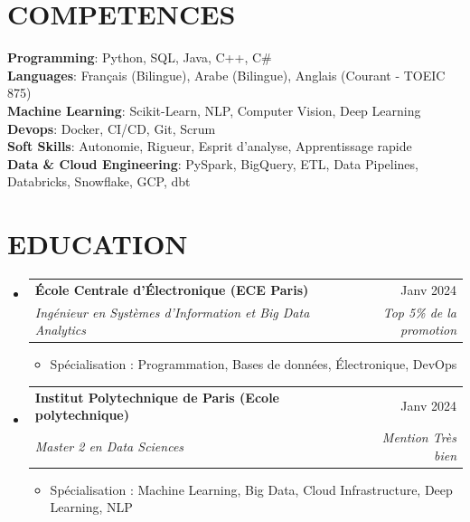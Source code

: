 \documentclass[11pt,a4paper]{article}
\makeatletter
\newcommand{\resumeItem}[1]{
  \item\footnotesize{
    {#1 \vspace{-1pt}}
  }
}
\newcommand{\resumeSubheading}[4]{
  \vspace{2pt}\item
    \begin{tabular*}{\textwidth}[t]{l@{\extracolsep{\fill}}r}
      {\small\textbf{#1}} & {\footnotesize#2} \\
      {\footnotesize\textit{#3}} & {\footnotesize\textit{#4}} \\
    \end{tabular*}\vspace{-4pt}
}
\newcommand{\resumeSubHeadingListStart}{\begin{itemize}[leftmargin=0in, label={}]}
\newcommand{\resumeSubHeadingListEnd}{\end{itemize}}
\newcommand{\resumeItemListStart}{\begin{itemize}[label={\textbullet}]}
\newcommand{\resumeItemListEnd}{\end{itemize}\vspace{0pt}}
\makeatother
\begin{document}
\section{COMPETENCES}
\begin{itemize}[leftmargin=0in, label={}]
\footnotesize{\item{
{\small\textbf{Programming}:} Python, SQL, Java, C++, C{\#} \\
\vspace{3pt}
{\small\textbf{Languages}:} Français (Bilingue), Arabe (Bilingue), Anglais (Courant - TOEIC 875) \\
\vspace{3pt}
{\small\textbf{Machine Learning}:} Scikit-Learn, NLP, Computer Vision, Deep Learning \\
\vspace{3pt}
{\small\textbf{Devops}:} Docker, CI/CD, Git, Scrum \\
\vspace{3pt}
{\small\textbf{Soft Skills}:} Autonomie, Rigueur, Esprit d'analyse, Apprentissage rapide \\
\vspace{3pt}
{\small\textbf{Data & Cloud Engineering}:} PySpark, BigQuery, ETL, Data Pipelines, Databricks, Snowflake, GCP, dbt
}
}
\end{itemize}

\section{EDUCATION}
\resumeSubHeadingListStart
    \resumeSubheading
      {École Centrale d'Électronique (ECE Paris)}
      {Janv 2024}
      {Ingénieur en Systèmes d'Information et Big Data Analytics}
      {Top 5\% de la promotion}
      \resumeItemListStart
        \resumeItem{Spécialisation : Programmation, Bases de données, Électronique, DevOps}
      \resumeItemListEnd
    \resumeSubheading
      {Institut Polytechnique de Paris (Ecole polytechnique)}
      {Janv 2024}
      {Master 2 en Data Sciences}
      {Mention Très bien}
      \resumeItemListStart
        \resumeItem{Spécialisation : Machine Learning, Big Data, Cloud Infrastructure, Deep Learning, NLP}
      \resumeItemListEnd
  \resumeSubHeadingListEnd
\end{document}
